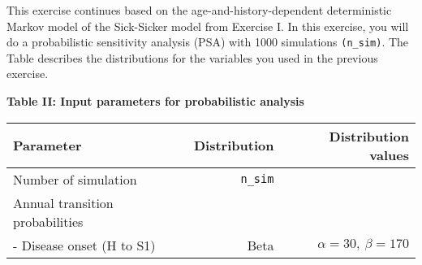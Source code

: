 \documentclass[
]{article}
\begin{document}
This exercise continues based on the age-and-history-dependent
deterministic Markov model of the Sick-Sicker model from Exercise I. In
this exercise, you will do a probabilistic sensitivity analysis (PSA)
with 1000 simulations \texttt{(n\_sim)}. The Table describes the
distributions for the variables you used in the previous exercise.

\textbf{Table II: Input parameters for probabilistic analysis}

\begin{longtable}[]{@{}lrr@{}}
\toprule
\begin{minipage}[b]{0.32\columnwidth}\raggedright
\textbf{Parameter}\strut
\end{minipage} & \begin{minipage}[b]{0.17\columnwidth}\raggedleft
\textbf{Distribution}\strut
\end{minipage} & \begin{minipage}[b]{0.42\columnwidth}\raggedleft
\textbf{Distribution values}\strut
\end{minipage}\tabularnewline
\midrule
\endhead
\begin{minipage}[t]{0.32\columnwidth}\raggedright
Number of simulation\strut
\end{minipage} & \begin{minipage}[t]{0.17\columnwidth}\raggedleft
\texttt{n\_sim}\strut
\end{minipage} & \begin{minipage}[t]{0.42\columnwidth}\raggedleft
1000\strut
\end{minipage}\tabularnewline
\begin{minipage}[t]{0.32\columnwidth}\raggedright
Annual transition probabilities\strut
\end{minipage} & \begin{minipage}[t]{0.17\columnwidth}\raggedleft
\strut
\end{minipage} & \begin{minipage}[t]{0.42\columnwidth}\raggedleft
\strut
\end{minipage}\tabularnewline
\begin{minipage}[t]{0.32\columnwidth}\raggedright
- Disease onset (H to S1)\strut
\end{minipage} & \begin{minipage}[t]{0.17\columnwidth}\raggedleft
Beta\strut
\end{minipage} & \begin{minipage}[t]{0.42\columnwidth}\raggedleft
\(\alpha=30, \ \beta=170\)\strut
\end{minipage}\tabularnewline

\end{longtable}
\end{document}
